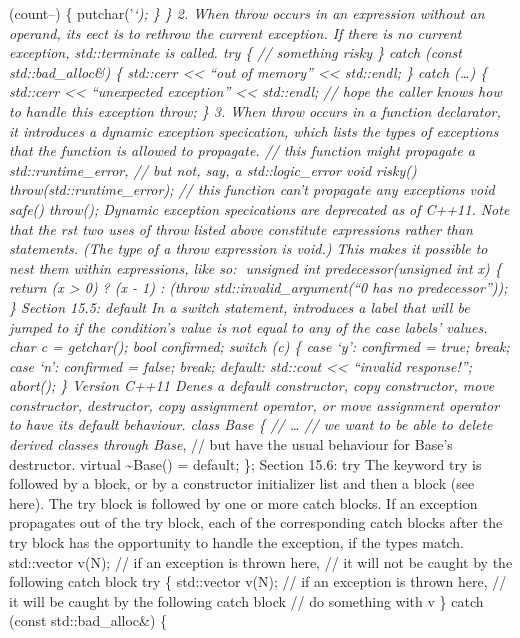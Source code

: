 (count--) \{ putchar('\emph{`); \} \} 2. When throw occurs in an
expression without an operand, its eect is to rethrow the current
exception. If there is no current exception, std::terminate is called.
try \{ // something risky \} catch (const std::bad\_alloc\&) \{
std::cerr \textless\textless{} ``out of memory'' \textless\textless{}
std::endl; \} catch (\ldots) \{ std::cerr \textless\textless{}
``unexpected exception'' \textless\textless{} std::endl; // hope the
caller knows how to handle this exception throw; \} 3. When throw occurs
in a function declarator, it introduces a dynamic exception specication,
which lists the types of exceptions that the function is allowed to
propagate. // this function might propagate a std::runtime\_error, //
but not, say, a std::logic\_error void risky()
throw(std::runtime\_error); // this function can't propagate any
exceptions void safe() throw(); Dynamic exception specications are
deprecated as of C++11. Note that the rst two uses of throw listed above
constitute expressions rather than statements. (The type of a throw
expression is void.) This makes it possible to nest them within
expressions, like so: unsigned int predecessor(unsigned int x) \{
return (x \textgreater{} 0) ? (x - 1) : (throw
std::invalid\_argument(``0 has no predecessor'')); \} Section 15.5:
default In a switch statement, introduces a label that will be jumped to
if the condition's value is not equal to any of the case labels' values.
char c = getchar(); bool confirmed; switch (c) \{ case `y': confirmed =
true; break; case `n': confirmed = false; break; default: std::cout
\textless\textless{} ``invalid response!\n''; abort(); \} Version C++11
Denes a default constructor, copy constructor, move constructor,
destructor, copy assignment operator, or move assignment operator to
have its default behaviour. class Base \{ // \ldots{} // we want to be
able to delete derived classes through Base}, // but have the usual
behaviour for Base's destructor. virtual \textasciitilde Base() =
default; \}; Section 15.6: try The keyword try is followed by a block,
or by a constructor initializer list and then a block (see here). The
try block is followed by one or more catch blocks. If an exception
propagates out of the try block, each of the corresponding catch blocks
after the try block has the opportunity to handle the exception, if the
types match. std::vector v(N); // if an exception is thrown here, // it
will not be caught by the following catch block try \{ std::vector v(N);
// if an exception is thrown here, // it will be caught by the following
catch block // do something with v \} catch (const std::bad\_alloc\&) \{
